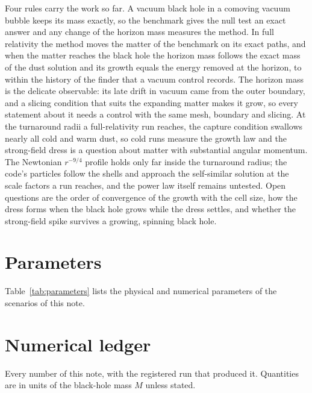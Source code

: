 \documentclass[aps,prd,twocolumn,10pt,superscriptaddress,nofootinbib,longbibliography,floatfix]{revtex4-2}
\begin{document}
Four rules carry the work so far. A vacuum black hole in a comoving vacuum bubble keeps its mass exactly, so the benchmark gives the null test an exact answer and any change of the horizon mass measures the method. In full relativity the method moves the matter of the benchmark on its exact paths, and when the matter reaches the black hole the horizon mass follows the exact mass of the dust solution and its growth equals the energy removed at the horizon, to within the history of the finder that a vacuum control records. The horizon mass is the delicate observable: its late drift in vacuum came from the outer boundary, and a slicing condition that suits the expanding matter makes it grow, so every statement about it needs a control with the same mesh, boundary and slicing. At the turnaround radii a full-relativity run reaches, the capture condition swallows nearly all cold and warm dust, so cold runs measure the growth law and the strong-field dress is a question about matter with substantial angular momentum. The Newtonian $r^{-9/4}$ profile holds only far inside the turnaround radius; the code's particles follow the shells and approach the self-similar solution at the scale factors a run reaches, and the power law itself remains untested. Open questions are the order of convergence of the growth with the cell size, how the dress forms when the black hole grows while the dress settles, and whether the strong-field spike survives a growing, spinning black hole.

\appendix

\section{Parameters}\label{app:parameters}

Table~\ref{tab:parameters} lists the physical and numerical parameters of the scenarios of this note.



\section{Numerical ledger}\label{app:ledger}

Every number of this note, with the registered run that produced it. Quantities are in units of the black-hole mass $M$ unless stated.




\end{document}
